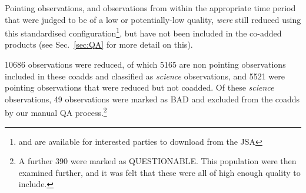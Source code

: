 \documentclass[usenatbib]{mn2e}
\newcommand{\sref}[1]{Sec.~\ref{#1}}
\newcommand{\status}[1]{\textsf{#1}}
\begin{document}
Pointing observations, and observations from within the
appropriate time period that were judged to be of a low or
potentially-low quality, \emph{were} still reduced using this
standardised configuration\footnote{and are available for interested
  parties to download from the JSA}, but have not been included in the
co-added products (see \sref{sec:QA} for more detail on this).

10686 observations were reduced, of which 5165 are non pointing
observations included in these coadds and classified as \emph{science}
observations, and 5521 were pointing
observations that were reduced but not coadded.
Of these \emph{science} observations, 49 observations were marked as \status{BAD}
and excluded from the coadds by our manual QA process.\footnote{A
  further 390 were marked as \status{QUESTIONABLE}. This population were then
  examined further, and it was felt that these were all of high enough
  quality to include.}
\end{document}
